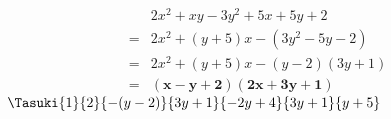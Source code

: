 \begin{align*}
 & 2x^2+xy-3y^2+5x+5y+2\\
={}& 2x^2+(y+5)x-(3y^2-5y-2)\\
={}& 2x^2+(y+5)x-(y-2)(3y+1)\\
={}& \bm{(x-y+2)(2x+3y+1)}
\end{align*}
$\Tasuki{1}{2}{-(y-2)}{3y+1}{-2y+4}{3y+1}{y+5}$
